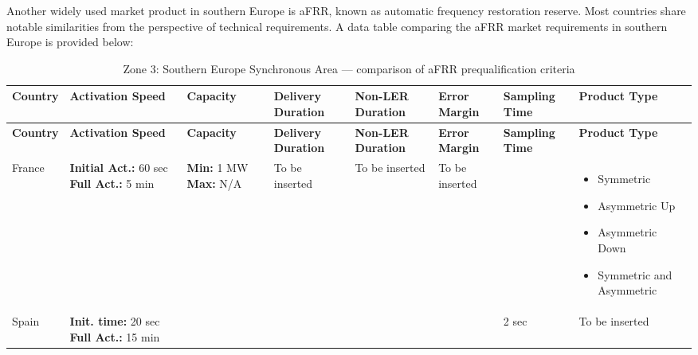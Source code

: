 \clearpage
\begin{landscape}

    Another widely used market product in southern Europe is aFRR, known as automatic frequency restoration reserve. Most countries share notable similarities from the perspective of technical requirements. A data table comparing the aFRR market requirements in southern Europe is provided below:


\tiny
\setlength{\tabcolsep}{4pt}
\renewcommand{\arraystretch}{1.3}
\setlength{\LTleft}{0pt}
\setlength{\LTright}{0pt}
\begin{longtable}{|p{2.5cm}|p{2.5cm}|p{2.5cm}|p{2.5cm}|p{2.5cm}|p{4cm}|p{2.5cm}|p{2.5cm}|}
\caption{Zone 3: Southern Europe Synchronous Area --- comparison of aFRR prequalification criteria}\label{tab:south_europe_afrr}\\
\hline
\textbf{Country} & \textbf{Activation Speed} & \textbf{Capacity} & \textbf{Delivery Duration} & \textbf{Non-LER Duration} & \textbf{Error Margin} & \textbf{Sampling Time} & \textbf{Product Type} \\
\hline
\endfirsthead

\hline
\textbf{Country} & \textbf{Activation Speed} & \textbf{Capacity} & \textbf{Delivery Duration} & \textbf{Non-LER Duration} & \textbf{Error Margin} & \textbf{Sampling Time} & \textbf{Product Type} \\
\hline
\endhead

France & 
\textbf{Initial Act.: }60 sec \newline
\textbf{Full Act.: }5 min
& 
\textbf{Min: }1 MW 
\newline \textbf{Max: }N/A
& To be inserted & 
To be inserted
& 
To be inserted
&  & 
\begin{itemize}[leftmargin=*, nosep]
  \item Symmetric
  \item Asymmetric Up
  \item Asymmetric Down
  \item Symmetric and Asymmetric
\end{itemize}\\
\hline

Spain & 
\textbf{Init. time:} 20 sec \newline
\textbf{Full Act.:} 15 min \newline
& 
& 
& 
& 
& 2 sec & To be inserted \\
\hline
\end{longtable}
\normalsize
\end{landscape}
